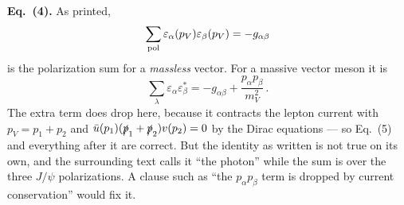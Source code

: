 \documentclass[11pt]{article}
\begin{document}
\textbf{Eq.~(4).} As printed,
\begin{equation*}
\sum_{\rm pol}\varepsilon_\alpha(p_V)\varepsilon_\beta(p_V)=-g_{\alpha\beta}
\end{equation*}
is the polarization sum for a \emph{massless} vector. For a massive vector meson
it is
\begin{equation*}
\sum_\lambda\varepsilon_\alpha\varepsilon_\beta^{*}
=-g_{\alpha\beta}+\frac{p_\alpha p_\beta}{m_V^{2}}\,.
\end{equation*}
The extra term does drop here, because it contracts the lepton current with
$p_V=p_1+p_2$ and $\bar u(p_1)(\slashed p_1+\slashed p_2)v(p_2)=0$ by the Dirac
equations --- so Eq.~(5) and everything after it are correct. But the identity as
written is not true on its own, and the surrounding text calls it ``the photon''
while the sum is over the three $J/\psi$ polarizations. A clause such as ``the
$p_\alpha p_\beta$ term is dropped by current conservation'' would fix it.
\end{document}
